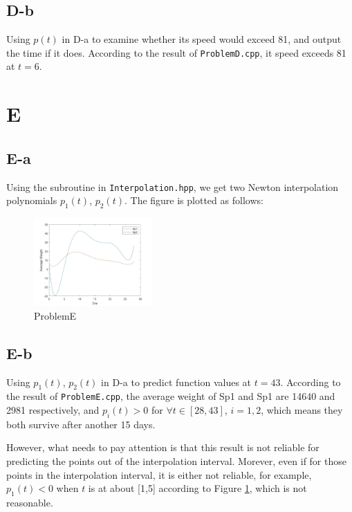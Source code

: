 \documentclass[a4paper]{article}
\begin{document}
\subsection*{D-b}
Using $p(t)$ in D-a to examine whether its speed would exceed 81, and output the time if it does.
According to the result of \verb|ProblemD.cpp|, it speed exceeds 81 at $t=6$.

\section*{E}
\subsection*{E-a}
Using the subroutine in \verb|Interpolation.hpp|, we get two Newton interpolation polynomials $p_1(t)$, $p_2(t)$. The figure is plotted as follows:
\begin{figure}[htbp]
  \centering
  \includegraphics[width=0.4\textwidth]{fig/ProblemE.jpg}
  \caption{ProblemE}
  \label{fig:ProblemE}
\end{figure}
\subsection*{E-b}
Using $p_1(t)$, $p_2(t)$ in D-a to predict function values at $t=43$. According to the result of \verb|ProblemE.cpp|, 
the average weight of Sp1 and Sp1 are 14640 and 2981 respectively, and $p_i(t) > 0$ for $\forall t \in [28,43]$, $i = 1,2$, 
which means they both survive after another 15 days.

However, what needs to pay attention is that this result is not reliable for predicting the points out of the interpolation interval. Morever, even if 
for those points in the interpolation interval, it is either not reliable, for example, $p_1(t) < 0$ when $t$ is at about [1,5] according to Figure \ref{fig:ProblemE}, which is not reasonable.
\end{document}
